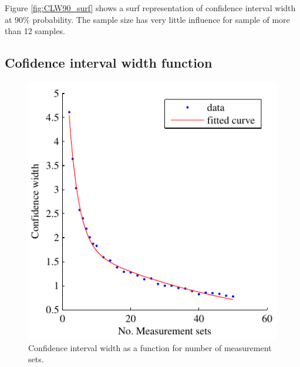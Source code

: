 \documentclass[aip,amsmath, reprint, author-year,nobalancelastpage]{revtex4-1}
\begin{document}
Figure \ref{fig:CLW90_surf} shows a surf representation of confidence interval width at $ 90 \%$ probability. The sample size has very little influence for sample of more than 12 samples. 

\newpage

\subsection{Cofidence interval width function}
\begin{figure}[H]
\includegraphics{regresion_sample_sets.pdf}
\caption{\label{fig:reg_sample} Confidence interval width as a function for number of measurement sets.   }
\end{figure}



\newpage
\end{document}
